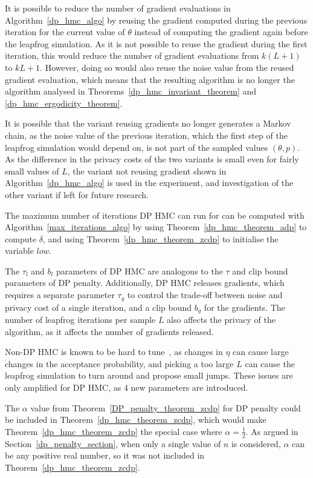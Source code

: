 \documentclass[english,twoside,openright]{HYgraduMLDS}
\begin{document}
It is possible to reduce the number of gradient evaluations in
Algorithm~\ref{dp_hmc_algo} by reusing the gradient computed during the previous
iteration for the current value of \(\theta\) instead of computing the gradient
again before the leapfrog simulation. As it is not possible to reuse the gradient
during the first iteration, this would reduce the number of gradient evaluations
from \(k(L + 1)\) to \(kL + 1\). However, doing so would
also reuse the noise value from the reused gradient evaluation, which means that
the resulting algorithm is no longer the algorithm analysed in
Theorems~\ref{dp_hmc_invariant_theorem} and \ref{dp_hmc_ergodicity_theorem}.

It is possible that the variant reusing gradients no longer
generates a Markov chain, as the noise value of the previous iteration, which
the first step of the leapfrog simulation would depend on, is not
part of the sampled values \((\theta, p)\). As the difference in the privacy
costs of the two variants is small even for fairly small values of \(L\),
the variant not reusing gradient shown in Algorithm~\ref{dp_hmc_algo}
is used in the experiment, and investigation of the other variant if left
for future research.

The maximum number of iterations DP HMC can run for can be computed with
Algorithm~\ref{max_iterations_algo} by using Theorem~\ref{dp_hmc_theorem_adp}
to compute \(\delta\), and using Theorem~\ref{dp_hmc_theorem_zcdp}
to initialise the variable \(low\).

The \(\tau_{l}\) and \(b_{l}\) parameters of DP HMC are analogous to the
\(\tau\) and clip bound parameters of DP penalty. Additionally, DP HMC
releases gradients, which requires a separate parameter \(\tau_{g}\) to
control the trade-off between noise and privacy cost of a single iteration,
and a clip bound \(b_{g}\) for the gradients. The number of leapfrog iterations
per sample \(L\) also affects the privacy of the algorithm, as it affects the
number of gradients released.

Non-DP HMC is known to be hard to tune~\cite{neal2012mcmc},
as changes in \(\eta\) can cause large changes in the acceptance probability,
and picking a too large \(L\) can cause the leapfrog simulation to turn
around and propose small jumps. These issues are only amplified for DP HMC,
as 4 new parameters are introduced.

The \(\alpha\) value from Theorem~\ref{DP_penalty_theorem_zcdp} for
DP penalty could be included in Theorem~\ref{dp_hmc_theorem_zcdp},
which would make Theorem~\ref{dp_hmc_theorem_zcdp} the special case where
\(\alpha = \frac{1}{2}\). As argued in Section~\ref{dp_penalty_section},
when only a single value of \(n\) is considered, \(\alpha\) can be
any positive real number, so it was not included in
Theorem~\ref{dp_hmc_theorem_zcdp}.
\end{document}
